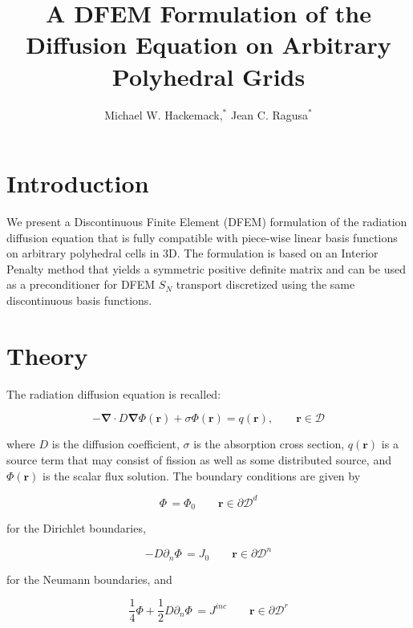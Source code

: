 \documentclass{anstrans}
\title{A DFEM Formulation of the Diffusion Equation on Arbitrary Polyhedral Grids}
\author{Michael W. Hackemack,$^{*}$ Jean C. Ragusa$^{*}$}
\institute{
$^{*}$Department of Nuclear Engineering, Texas A\&M Univeristy, 3133 TAMU, College Station, TX
}
\renewcommand{\vec}[1]{\bm{#1}} %
\begin{document}
\section{Introduction}

We present a Discontinuous Finite Element (DFEM) formulation of the radiation diffusion equation that is fully compatible with piece-wise linear basis functions on arbitrary polyhedral cells in 3D. The formulation is based on an Interior Penalty method that yields a symmetric positive definite matrix and can be used as a preconditioner for DFEM $S_N$ transport discretized using the same discontinuous basis functions. 

\section{Theory}

The radiation diffusion equation is recalled:

\begin{equation} \label{eq:DIffEq}
- \vec{\nabla} \cdot D \vec{\nabla} \Phi(\vec{r}) + \sigma \Phi(\vec{r}) = q(\vec{r}), \qquad \vec{r} \in \mathcal{D}
\end{equation}

\noindent where $D$ is the diffusion coefficient, $\sigma$ is the absorption cross section, $q(\vec{r})$ is a source term that may consist of fission as well as some distributed source, and $\Phi(\vec{r})$ is the scalar flux solution. The boundary conditions are given by

\begin{equation} \label{eq:dirichlet_bndy}
\Phi \, =\Phi_0 \qquad \vec{r} \in \partial \mathcal{D}^d
\end{equation}

\noindent for the Dirichlet boundaries,

\begin{equation} \label{eq:neumann_bndy}
- D \partial_n \Phi \, = J_{0} \qquad \vec{r} \in \partial \mathcal{D}^n
\end{equation}

\noindent for the Neumann boundaries, and

\begin{equation} \label{eq:robin_bndy}
 \frac{1}{4} \Phi + \frac{1}{2} D \partial_n \Phi \, = J^{inc} \qquad \vec{r} \in \partial \mathcal{D}^r
\end{equation}
\end{document}

